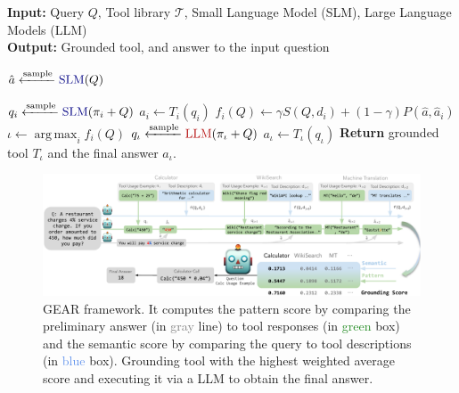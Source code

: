 \documentclass[11pt]{article}
\newcommand{\llm}{\textcolor{darkredTwo}{LLM}}
\newcommand{\slm}{\textcolor{darkblueTwo}{SLM}}
\newcommand{\name}{{\fontfamily{cmss}\selectfont GEAR}}
\begin{document}
\begin{algorithm}[ht]
\caption{\name{} Algorithm}
\label{Algorithm}
\small
\begin{flushleft}
        \textbf{Input:} Query $Q$, Tool library $\mathcal{T}$, Small Language Model (\slm), Large Language Models (\llm)\\
        \textbf{Output:} Grounded tool, and answer to the input question 
\end{flushleft}
\begin{algorithmic}[1]
\State $\hat{a} \sample \text{\slm}(Q)$

\State $q_i \sample \text{\slm}(\pi_i +  Q)$ \Comment{\textcolor{darkgreen}{Generate API call}} 
\State $\hat{a}_i \leftarrow T_i(q_i)$ \Comment{\textcolor{darkgreen}{Get the tool's response}}
\State $f_i(Q) \leftarrow \gamma S(Q,d_i) + (1-\gamma)P(\hat{a}, \hat{a}_i)$ \Comment{\textcolor{darkgreen}{Score it}} 
\EndFor
\State $\iota \leftarrow \operatorname*{arg\,max}_{i}f_i(Q)$ \Comment{\textcolor{darkgreen}{Select the best tool}} 
  \State $q_{\iota} \sample \text{\llm}(\pi_{\iota} + Q)$ 
  \Comment{\textcolor{darkgreen}{Generate API call}}
\State $a_\iota \leftarrow T_{\iota}(q_{\iota})$ \Comment{\textcolor{darkgreen}{API call to the selected tool}} 
\State \textbf{Return} grounded tool $T_{\iota}$ and the final answer ${a_\iota}$. 
\end{algorithmic}
\end{algorithm} 

\begin{figure}[t]
    \centering
    \includegraphics[width=\linewidth]{figures/TaLL.pdf}
    \caption{
    \name{} framework. It computes the pattern score by comparing the preliminary answer (in \textcolor{gray}{gray} line) to tool responses (in \textcolor{ForestGreen}{green} box) and the semantic score by comparing the query to tool descriptions (in \textcolor{CornflowerBlue}{blue} box). Grounding tool with the highest weighted average score and executing it via a \llm{} to obtain the final answer.} 
    \label{figure:framework}
\end{figure}
\end{document}
